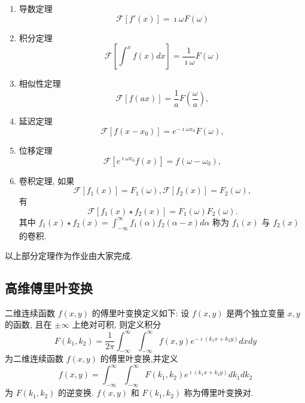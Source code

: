 \begin{enumerate}
    \item 导数定理
    \begin{equation}
        \mathcal{F} [f'(x)] = \imath \omega F(\omega)
    \end{equation}

    \item 积分定理
    \begin{equation}
        \mathcal{F} [ \int^{x} f(x) dx ] = \frac{1}{\imath \omega} F(\omega)
    \end{equation}

    \item 相似性定理
    \begin{equation}
        \mathcal{F} [ f(ax) ] = \frac{1}{a} F(\frac{\omega}{a}),
    \end{equation}
    \item 延迟定理
    \begin{equation}
        \mathcal{F} [ f(x - x_0 ) ] = e^{-\imath \omega x_0} F(\omega),
    \end{equation}
    \item 位移定理
    \begin{equation}
        \mathcal{F} [ e^{\imath \omega x_0} f(x) ] = f(\omega - \omega_0),
    \end{equation}
    \item 卷积定理, 如果
    \[
        \mathcal{F} [f_1(x)] =  F_1(\omega), \mathcal{F} [f_2(x)] =  F_2(\omega), 
    \]
    有
    \begin{equation}
        \mathcal{F} [f_1(x)\star f_2(x) ] = F_1(\omega) F_2(\omega).
    \end{equation}
    其中 $f_1(x) \star f_2(x)=\int_{-\infty}^{\infty} f_1(\alpha) f_2(\alpha-x) d \alpha$ 称为 $f_1(x)$ 与 $f_2(x)$ 的卷积.
\end{enumerate}
以上部分定理作为作业由大家完成.
\subsection{高维傅里叶变换}

二维连续函数 $f(x, y)$ 的傅里叶变换定义如下:
设 $f(x, y)$ 是两个独立变量 $x, y$ 的函数, 且在 $\pm \infty$ 上绝对可积, 则定义积分
$$
F\left(k_1, k_2\right)=\frac{1}{2 \pi} \int_{-\infty}^{\infty} \int_{-\infty}^{\infty} f(x, y) e^{-\imath\left(k_1 x+k_2 y\right)} d x d y
$$
为二维连续函数 $f(x, y)$ 的傅里叶变换,并定义
$$
f(x, y)=\int_{-\infty}^{\infty} \int_{-\infty}^{\infty} F\left(k_1, k_2\right) e^{\imath\left(k_1 x+k_2 y\right)} d k_1 d k_2
$$
为 $F\left(k_1, k_2\right)$ 的逆变换.
$f(x, y)$ 和 $F\left(k_1, k_2\right)$ 称为傅里叶变换对.

